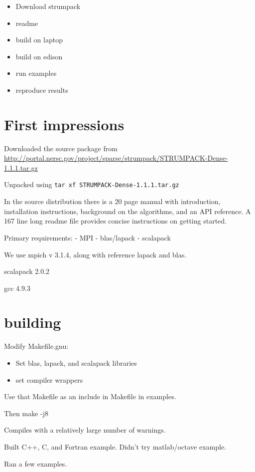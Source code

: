 \usepackage{url}


\begin{itemize}
  \item Download strumpack
  \item readme
  \item build on laptop
  \item build on edison
  \item run examples
  \item reproduce results

\end{itemize}

\section{First impressions}

Downloaded the source package from
\url{http://portal.nersc.gov/project/sparse/strumpack/STRUMPACK-Dense-1.1.1.tar.gz}

Unpacked using \verb!tar xf STRUMPACK-Dense-1.1.1.tar.gz!

In the source distribution there is a 20 page manual with
introduction, installation instructions, background on the
algorithms, and an API reference.  A 167 line long readme file
provides concise instructions on getting started.

Primary requirements:
- MPI
- blas/lapack
- scalapack

We use mpich v 3.1.4, along with reference lapack and blas.

scalapack 2.0.2

gcc 4.9.3


\section{building}

Modify Makefile.gnu:
\begin{itemize}
\item Set blas, lapack, and scalapack libraries
\item set compiler wrappers
\end{itemize}

Use that Makefile as an include in Makefile in examples.

Then make -j8


Compiles with a relatively large number of warnings.

Built C++, C, and Fortran example.  Didn't try matlab/octave example.

Ran a few examples.




